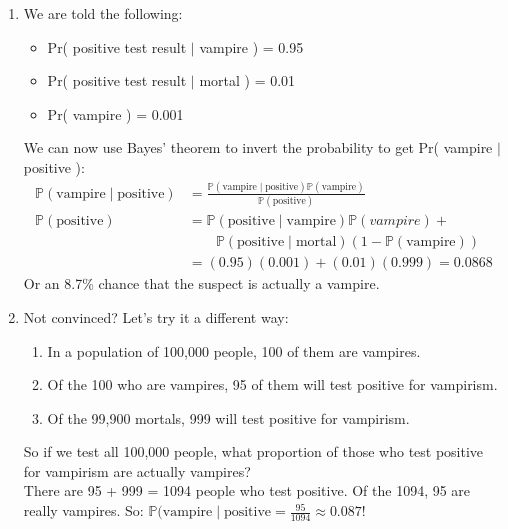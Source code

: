 \documentclass[14pt]{extarticle}
\begin{document}
\begin{enumerate}
	\item We are told the following:
	\begin{itemize}
		\item Pr( positive test result $\mid$ vampire ) = 0.95
		\item Pr( positive test result $\mid$ mortal ) = 0.01
		\item Pr( vampire ) = 0.001
	\end{itemize}
	We can now use Bayes' theorem to invert the probability to get Pr( vampire $\mid$ positive ):
	\begin{align*}
		\mathbb{P} ( \text{vampire} \mid \text{positive} ) 	&= \frac{ \mathbb{P} ( \text{vampire} \mid \text{positive} ) \mathbb{P} ( \text{vampire} ) }{ \mathbb{P} ( \text{positive} ) }	\\
		\mathbb{P} ( \text{positive} ) 					&= \mathbb{P} ( \text{positive} \mid \text{vampire} ) \mathbb{P} ( vampire ) + \\
								&\qquad \mathbb{P} ( \text{positive} \mid \text{mortal} ) \left( 1 - \mathbb{P} ( \text{vampire} ) \right) \\
												&= (0.95)(0.001) + (0.01)(0.999) = 0.0868
	\end{align*}
	Or an 8.7\% chance that the suspect is actually a vampire.
	\item Not convinced? Let's try it a different way:
	\begin{enumerate}
		\item In a population of 100,000 people, 100 of them are vampires.
		\item Of the 100 who are vampires, 95 of them will test positive for vampirism.
		\item Of the 99,900 mortals, 999 will test positive for vampirism.
	\end{enumerate}
	So if we test all 100,000 people, what proportion of those who test positive for vampirism are actually vampires? \\
	
	There are 95 + 999 = 1094 people who test positive. Of the 1094, 95 are really vampires. So: $\mathbb{P} ( \text{vampire} \mid \text{positive} = \frac{95}{1094} \approx 0.087$!
\end{enumerate}
\end{document}
